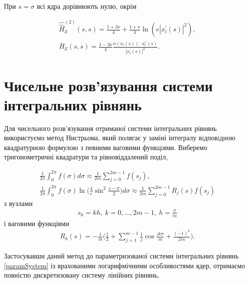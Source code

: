 \documentclass[12pt]{report}
\begin{document}
 При $s=\sigma$ всі ядра дорівнюють нулю, окрім 
 
 \begin{gather*}
	\hat{\hat{H}}^{(2)}_{ll}(s, s) = \frac{1+3\nu}{4}+\frac{1+\nu}{4}\ln(e|x_l^{'}(s)|^2), \\
	\bar{H}_{ll}(s,s)=\frac{1-3\nu}{4}\frac{n(x_l(s))\cdot x_l^{''}(s)}{|x_l^{'}(s)|^2}.
 \end{gather*}
 
\section{Чисельне розв'язування системи інтегральних рівнянь}

Для чисельного розв'язування отриманої системи інтегральних рівнянь використуємо метод Нистрьома, який полягає у заміні інтегралу вiдповiдною квадратурною формулою з певними ваговими функцiями. Виберемо тригонометричні квадратури та рівновіддалений поділ,

\begin{gather}
 	\frac{1}{2\pi}\int_{0}^{2\pi}f(\sigma)d\sigma\approx\frac{1}{2m}\sum_{j=0}^{2m-1}f(s_j), \\
	\frac{1}{2\pi}\int_{0}^{2\pi}f(\sigma)\ln\bigg(\frac{4}{e}\sin^2\frac{s-\sigma}{2}\bigg)d\sigma\approx\frac{1}{2m}\sum_{j=0}^{2m-1}R_j(s)f(s_j)
 \end{gather}
 з вузлами
 \begin{gather}
 	s_k=kh, \ k=0,...,2m-1, \ h=\frac{\pi}{m}
  \end{gather}
  і ваговими функціями
  \begin{gather}
 	R_k(s)=-\frac{1}{m}\bigg(\frac{1}{2}+\sum_{j=1}^{m-1}\frac{1}{j}\cos \frac{jk\pi}{m}+ \frac{(-1)^k}{2m}\bigg).
  \end{gather}

Застосувавши даний метод до параметризованої системи інтегральних рівнянь \eqref{paramSystem} із врахованими логарифмічними особливостями ядер, отримаємо повністю дискретизовану систему лінійних рівнянь,
\end{document}
